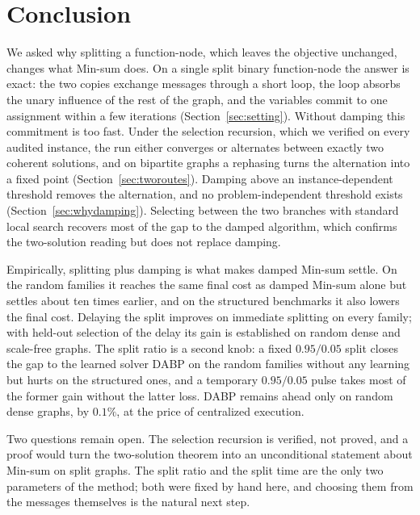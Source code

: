\section{Conclusion}
\label{sec:conclusion}
We asked why splitting a function-node, which leaves the objective unchanged,
changes what Min-sum does.  On a single split binary function-node the answer
is exact: the two copies exchange messages through a short loop, the loop
absorbs the unary influence of the rest of the graph, and the variables commit
to one assignment within a few iterations (Section~\ref{sec:setting}).
Without damping this commitment is too fast.  Under the selection recursion,
which we verified on every audited instance, the run either converges or
alternates between exactly two coherent solutions, and on bipartite graphs a
rephasing turns the alternation into a fixed point
(Section~\ref{sec:tworoutes}).
Damping above an instance-dependent threshold removes the alternation, and
no problem-independent threshold exists (Section~\ref{sec:whydamping}).
Selecting between the two branches with standard local search recovers most
of the gap to the damped algorithm, which confirms the two-solution reading
but does not replace damping.

Empirically, splitting plus damping is what makes damped Min-sum settle.  On
the random families it reaches the same final cost as damped Min-sum alone
but settles about ten times earlier, and on the structured benchmarks it also
lowers the final cost.  Delaying the split improves on immediate splitting
on every family; with held-out selection of the delay its gain is established
on random dense and scale-free graphs.  The split ratio is a second knob: a
fixed $0.95/0.05$ split closes the gap to the learned solver DABP on the
random families without any learning but hurts on the structured ones, and a
temporary $0.95/0.05$ pulse takes most of the former gain without the latter
loss.  DABP remains ahead only on random dense graphs, by $0.1\%$, at the
price of centralized execution.

Two questions remain open.  The selection recursion is verified, not proved,
and a proof would turn the two-solution theorem into an unconditional
statement about Min-sum on split graphs.  The split ratio and the split time
are the only two parameters of the method; both were fixed by hand here, and
choosing them from the messages themselves is the natural next step.
